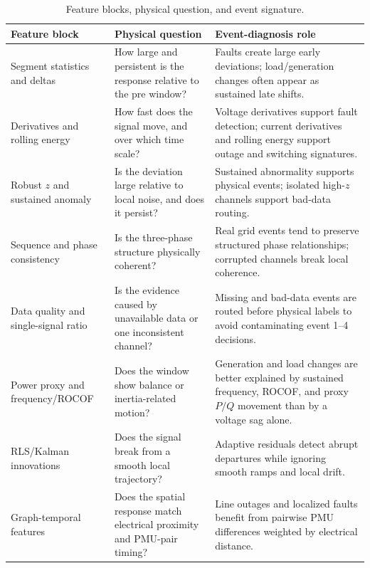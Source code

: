 \documentclass[conference]{IEEEtran}
\begin{document}
\begin{table}[t]
\centering
\caption{Feature blocks, physical question, and event signature.}
\label{tab:features}
\renewcommand{\arraystretch}{1.08}
\footnotesize
\begin{tabular}{@{}p{}p{}p{}@{}}
\toprule
\textbf{Feature block} & \textbf{Physical question} & \textbf{Event-diagnosis role} \\
\midrule
Segment statistics and deltas & How large and persistent is the response relative to the pre window? & Faults create large early deviations; load/generation changes often appear as sustained late shifts. \\
Derivatives and rolling energy & How fast does the signal move, and over which time scale? & Voltage derivatives support fault detection; current derivatives and rolling energy support outage and switching signatures. \\
Robust $z$ and sustained anomaly & Is the deviation large relative to local noise, and does it persist? & Sustained abnormality supports physical events; isolated high-$z$ channels support bad-data routing. \\
Sequence and phase consistency & Is the three-phase structure physically coherent? & Real grid events tend to preserve structured phase relationships; corrupted channels break local coherence. \\
Data quality and single-signal ratio & Is the evidence caused by unavailable data or one inconsistent channel? & Missing and bad-data events are routed before physical labels to avoid contaminating event 1--4 decisions. \\
Power proxy and frequency/ROCOF & Does the window show balance or inertia-related motion? & Generation and load changes are better explained by sustained frequency, ROCOF, and proxy $P/Q$ movement than by a voltage sag alone. \\
RLS/Kalman innovations & Does the signal break from a smooth local trajectory? & Adaptive residuals detect abrupt departures while ignoring smooth ramps and local drift. \\
Graph-temporal features & Does the spatial response match electrical proximity and PMU-pair timing? & Line outages and localized faults benefit from pairwise PMU differences weighted by electrical distance. \\
\bottomrule
\end{tabular}
\end{table}
\end{document}
